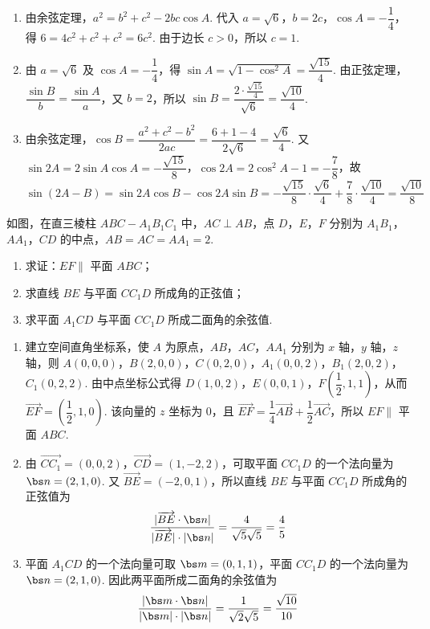 \begin{solution}
\begin{enumerate}
\item 由余弦定理，\(a^2=b^2+c^2-2bc\cos A\). 代入 \(a=\sqrt6\)，\(b=2c\)，\(\cos A=-\dfrac14\)，得 \(6=4c^2+c^2+c^2=6c^2\). 由于边长 \(c>0\)，所以 \(c=1\).
\item 由 \(a=\sqrt6\) 及 \(\cos A=-\dfrac14\)，得 \(\sin A=\sqrt{1-\cos^2A}=\dfrac{\sqrt{15}}4\). 由正弦定理，\(\dfrac{\sin B}{b}=\dfrac{\sin A}{a}\)，又 \(b=2\)，所以 \(\sin B=\dfrac{2\cdot\frac{\sqrt{15}}{4}}{\sqrt6}=\dfrac{\sqrt{10}}4\).
\item 由余弦定理，\(\cos B=\dfrac{a^2+c^2-b^2}{2ac}=\dfrac{6+1-4}{2\sqrt6}=\dfrac{\sqrt6}{4}\). 又 \(\sin 2A=2\sin A\cos A=-\dfrac{\sqrt{15}}8\)，\(\cos 2A=2\cos^2A-1=-\dfrac78\)，故
\[
\sin(2A-B)=\sin2A\cos B-\cos2A\sin B
=-\dfrac{\sqrt{15}}8\cdot\dfrac{\sqrt6}{4}+\dfrac78\cdot\dfrac{\sqrt{10}}4
=\dfrac{\sqrt{10}}8
\]
\end{enumerate}
\end{solution}

\begin{problem}
如图，在直三棱柱 \(ABC-A_1B_1C_1\) 中，\(AC\perp AB\)，点 \(D\)，\(E\)，\(F\) 分别为 \(A_1B_1\)，\(AA_1\)，\(CD\) 的中点，\(AB=AC=AA_1=2\).

\begin{enumerate}
\item 求证：\(EF\parallel\) 平面 \(ABC\)；
\item 求直线 \(BE\) 与平面 \(CC_1D\) 所成角的正弦值；
\item 求平面 \(A_1CD\) 与平面 \(CC_1D\) 所成二面角的余弦值.
\end{enumerate}

\end{problem}

\begin{solution}
\begin{enumerate}
\item 建立空间直角坐标系，使 \(A\) 为原点，\(AB\)，\(AC\)，\(AA_1\) 分别为 \(x\) 轴，\(y\) 轴，\(z\) 轴，则 \(A(0,0,0)\)，\(B(2,0,0)\)，\(C(0,2,0)\)，\(A_1(0,0,2)\)，\(B_1(2,0,2)\)，\(C_1(0,2,2)\). 由中点坐标公式得 \(D(1,0,2)\)，\(E(0,0,1)\)，\(F(\dfrac12,1,1)\)，从而 \(\overrightarrow{EF}=(\dfrac12,1,0)\). 该向量的 \(z\) 坐标为 \(0\)，且 \(\overrightarrow{EF}=\dfrac14\overrightarrow{AB}+\dfrac12\overrightarrow{AC}\)，所以 \(EF\parallel\) 平面 \(ABC\).
\item 由 \(\overrightarrow{CC_1}=(0,0,2)\)，\(\overrightarrow{CD}=(1,-2,2)\)，可取平面 \(CC_1D\) 的一个法向量为 \(\bs n=(2,1,0)\). 又 \(\overrightarrow{BE}=(-2,0,1)\)，所以直线 \(BE\) 与平面 \(CC_1D\) 所成角的正弦值为
\[
\dfrac{|\overrightarrow{BE}\cdot\bs n|}{|\overrightarrow{BE}|\cdot|\bs n|}=\dfrac{4}{\sqrt{5}\sqrt{5}}=\dfrac45
\]
\item 平面 \(A_1CD\) 的一个法向量可取 \(\bs m=(0,1,1)\)，平面 \(CC_1D\) 的一个法向量为 \(\bs n=(2,1,0)\). 因此两平面所成二面角的余弦值为
\[
\dfrac{|\bs m\cdot\bs n|}{|\bs m|\cdot|\bs n|}=\dfrac{1}{\sqrt{2}\sqrt{5}}=\dfrac{\sqrt{10}}{10}
\]
\end{enumerate}
\end{solution}

